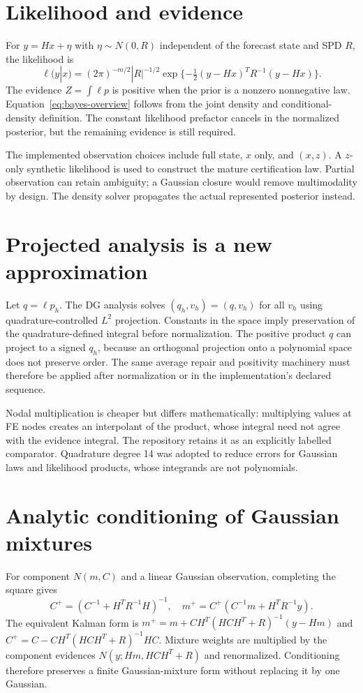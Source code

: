 \section{Likelihood and evidence}
For $y=Hx+\eta$ with $\eta\sim N(0,R)$ independent of the forecast state and SPD $R$, the likelihood is
\begin{equation}
\ell(y|x)=(2\pi)^{-m/2}|R|^{-1/2}\exp\{-\tfrac12(y-Hx)^TR^{-1}(y-Hx)\}.
\end{equation}
The evidence $Z=\int\ell p$ is positive when the prior is a nonzero nonnegative law. Equation~\eqref{eq:bayes-overview} follows from the joint density and conditional-density definition. The constant likelihood prefactor cancels in the normalized posterior, but the remaining evidence is still required.

The implemented observation choices include full state, $x$ only, and $(x,z)$. A $z$-only synthetic likelihood is used to construct the mature certification law. Partial observation can retain ambiguity; a Gaussian closure would remove multimodality by design. The density solver propagates the actual represented posterior instead.

\section{Projected analysis is a new approximation}
Let $q=\ell p_h$. The DG analysis solves $(q_h,v_h)=(q,v_h)$ for all $v_h$ using quadrature-controlled $L^2$ projection. Constants in the space imply preservation of the quadrature-defined integral before normalization. The positive product $q$ can project to a signed $q_h$, because an orthogonal projection onto a polynomial space does not preserve order. The same average repair and positivity machinery must therefore be applied after normalization or in the implementation's declared sequence.

Nodal multiplication is cheaper but differs mathematically: multiplying values at FE nodes creates an interpolant of the product, whose integral need not agree with the evidence integral. The repository retains it as an explicitly labelled comparator. Quadrature degree 14 was adopted to reduce errors for Gaussian laws and likelihood products, whose integrands are not polynomials.

\section{Analytic conditioning of Gaussian mixtures}
For component $N(m,C)$ and a linear Gaussian observation, completing the square gives
\begin{equation}
C^+=(C^{-1}+H^TR^{-1}H)^{-1},\quad
m^+=C^+(C^{-1}m+H^TR^{-1}y).
\end{equation}
The equivalent Kalman form is $m^+=m+CH^T(HCH^T+R)^{-1}(y-Hm)$ and $C^+=C-CH^T(HCH^T+R)^{-1}HC$. Mixture weights are multiplied by the component evidences $N(y;Hm,HCH^T+R)$ and renormalized. Conditioning therefore preserves a finite Gaussian-mixture form without replacing it by one Gaussian.

